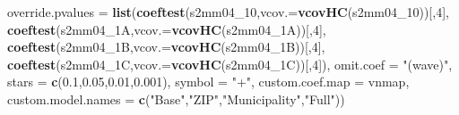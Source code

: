 \documentclass[
]{article}
\newenvironment{Shaded}{\begin{snugshade}}{\end{snugshade}}
\newcommand{\DataTypeTok}[1]{\textcolor[rgb]{0.13,0.29,0.53}{#1}}
\newcommand{\DecValTok}[1]{\textcolor[rgb]{0.00,0.00,0.81}{#1}}
\newcommand{\FloatTok}[1]{\textcolor[rgb]{0.00,0.00,0.81}{#1}}
\newcommand{\KeywordTok}[1]{\textcolor[rgb]{0.13,0.29,0.53}{\textbf{#1}}}
\newcommand{\NormalTok}[1]{#1}
\newcommand{\StringTok}[1]{\textcolor[rgb]{0.31,0.60,0.02}{#1}}
\begin{document}
\begin{Shaded}
\begin{Highlighting}[]
          \DataTypeTok{override.pvalues =} \KeywordTok{list}\NormalTok{(}\KeywordTok{coeftest}\NormalTok{(s2mm04_}\DecValTok{10}\NormalTok{,}\DataTypeTok{vcov.=}\KeywordTok{vcovHC}\NormalTok{(s2mm04_}\DecValTok{10}\NormalTok{))[,}\DecValTok{4}\NormalTok{],}
                                  \KeywordTok{coeftest}\NormalTok{(s2mm04_1A,}\DataTypeTok{vcov.=}\KeywordTok{vcovHC}\NormalTok{(s2mm04_1A))[,}\DecValTok{4}\NormalTok{],}
                                  \KeywordTok{coeftest}\NormalTok{(s2mm04_1B,}\DataTypeTok{vcov.=}\KeywordTok{vcovHC}\NormalTok{(s2mm04_1B))[,}\DecValTok{4}\NormalTok{],}
                                  \KeywordTok{coeftest}\NormalTok{(s2mm04_1C,}\DataTypeTok{vcov.=}\KeywordTok{vcovHC}\NormalTok{(s2mm04_1C))[,}\DecValTok{4}\NormalTok{]),}
          \DataTypeTok{omit.coef =} \StringTok{"(wave)"}\NormalTok{, }\DataTypeTok{stars =} \KeywordTok{c}\NormalTok{(}\FloatTok{0.1}\NormalTok{,}\FloatTok{0.05}\NormalTok{,}\FloatTok{0.01}\NormalTok{,}\FloatTok{0.001}\NormalTok{), }\DataTypeTok{symbol =} \StringTok{"+"}\NormalTok{,}
          \DataTypeTok{custom.coef.map =}\NormalTok{ vnmap, }
          \DataTypeTok{custom.model.names =} \KeywordTok{c}\NormalTok{(}\StringTok{"Base"}\NormalTok{,}\StringTok{"ZIP"}\NormalTok{,}\StringTok{"Municipality"}\NormalTok{,}\StringTok{"Full"}\NormalTok{))}
\end{Highlighting}
\end{Shaded}
\end{document}
